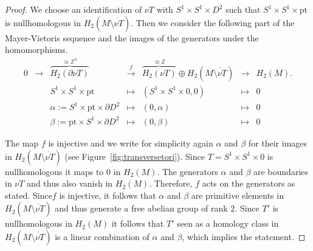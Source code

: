 \documentclass{amsart} %
\DeclareMathOperator{\lk}{lk}
\newcommand{\R}{\mathbb{R}}
\newcommand{\Z}{\mathbb{Z}}
\theoremstyle{thm}
\theoremstyle{definition}
\begin{document}
\begin{proof}
We choose an identification of $\nu T$ with $S^1 \times S^1\times D^2$ such that $S^1\times S^1\times \text{pt}$ is nullhomologous in $H_2(M\setminus\mathring{\nu T})$. Then we consider the following part of the Mayer-Vietoris sequence and the images of the generators under the homomorphisms.
\[\begin{array}{ccccccc}
0&{{\longrightarrow}}& \overset{\cong \Z^3}{\overbrace{H_2(\partial\nu T)}} &\overset{f}{\longrightarrow} &\overset{\cong \Z}{\overbrace{H_2(\nu T)}}\oplus H_2(M\setminus\mathring{\nu T})&\longrightarrow& H_2(M).\\
&&S^1\times S^1\times \text{pt}&\longmapsto& (S^1\times S^1\times0,0)&\longmapsto&0\\
&&\alpha:=S^1\times\text{pt}\times \partial D^2&\longmapsto& (0,\alpha)&\longmapsto&0\\
&&\beta:=\text{pt}\times S^1\times \partial D^2&\longmapsto&(0,\beta)&\longmapsto&0
\end{array}\]

The map $f$ is injective and we write for simplicity again $\alpha$ and $\beta$ for their images in $H_2(M\setminus\mathring{\nu T})$ (see Figure~\ref{fig:transversetori}). Since $T=S^1\times S^1\times 0$ is nullhomologous it maps to $0$ in $H_2(M)$. The generators $\alpha$ and $\beta$ are boundaries in $\nu T$ and thus also vanish in $H_2(M)$. Therefore, $f$ acts on the generators as stated. Since$f$ is injective, it follows that $\alpha$ and $\beta$ are primitive elements in $H_2(M\setminus\mathring{\nu T})$ and thus generate a free abelian group of rank $2$.
Since $T'$ is nullhomologous in $H_2(M)$ it follows that $T'$ seen as a homology class in $H_2(M\setminus\mathring{\nu T})$ is a linear combination of $\alpha$ and $\beta$, which implies the statement.
\end{proof}


\end{document}
